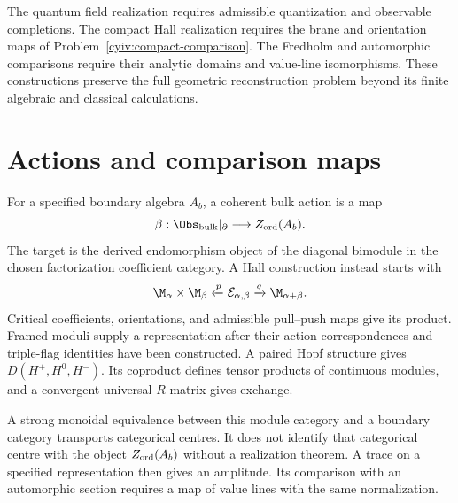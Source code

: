 The quantum field realization requires admissible quantization and
observable completions.
The compact Hall realization requires the brane and orientation maps
of Problem~\ref{cyiv:compact-comparison}.
The Fredholm and automorphic comparisons require their analytic domains
and value-line isomorphisms.
These constructions preserve the full geometric reconstruction problem
beyond its finite algebraic and classical calculations.

\chapter{Actions and comparison maps}
For a specified boundary algebra $A_b$, a coherent bulk action is a map
\[
 \beta:\Obs_{\mathrm{bulk}}|_\partial\longrightarrow Z_{\ord}(A_b).
\]
The target is the derived endomorphism object of the diagonal bimodule
in the chosen factorization coefficient category.
A Hall construction instead starts with
\[
 \M_\alpha\times\M_\beta\xleftarrow{p}\mathcal E_{\alpha,\beta}
 \xrightarrow{q}\M_{\alpha+\beta}.
\]
Critical coefficients, orientations, and admissible pull--push maps
give its product.
Framed moduli supply a representation after their action
correspondences and triple-flag identities have been constructed.
A paired Hopf structure gives $D(H^+,H^0,H^-)$.
Its coproduct defines tensor products of continuous modules, and a
convergent universal $R$-matrix gives exchange.

A strong monoidal equivalence between this module category and a
boundary category transports categorical centres.
It does not identify that categorical centre with the object
$Z_{\mathrm{ord}}(A_b)$ without a realization theorem.
A trace on a specified representation then gives an amplitude.
Its comparison with an automorphic section requires a map of value
lines with the same normalization.

